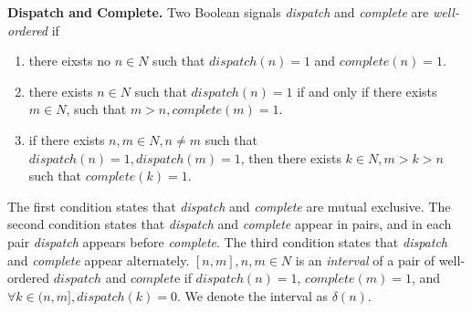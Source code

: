 {\bf Dispatch and Complete.}
Two Boolean signals \emph{dispatch} and \emph{complete} are \emph{well-ordered} if 
\begin{enumerate}
	\item there eixsts no $n\in N$ such that $dispatch(n) = 1$ and $complete(n) =  1$.
	\item there exists $n\in N$ such that $dispatch(n) = 1$ if and only if there exists $m\in N$, such that $m > n, complete(m) =  1$.
	\item if there exists $n,m\in N, n \neq m$ such that $dispatch(n) = 1, dispatch(m) = 1$, then there exists $k\in N, m >k> n$ such that $complete(k) = 1$.
\end{enumerate}
The first condition states that \emph{dispatch} and \emph{complete} are mutual exclusive. The second condition states that \emph{dispatch} and \emph{complete} appear in pairs, and in each pair \emph{dispatch} appears before \emph{complete}. The third condition states that \emph{dispatch} and \emph{complete} appear alternately. 
$[n, m], n,m \in N$ is an \emph{interval} of a pair of well-ordered $dispatch$ and $complet$e if $dispatch(n) = 1$, $complete(m) = 1$, and $\forall k\in (n, m], dispatch(k)=0$. We denote the interval as $\delta(n)$.


